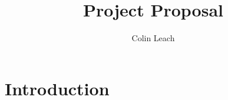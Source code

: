 \documentclass{aastex63}
\begin{document}
	
\title{Project Proposal}

\author[0000-0003-3608-1546]{Colin Leach}

\section{Introduction}
\end{document}
